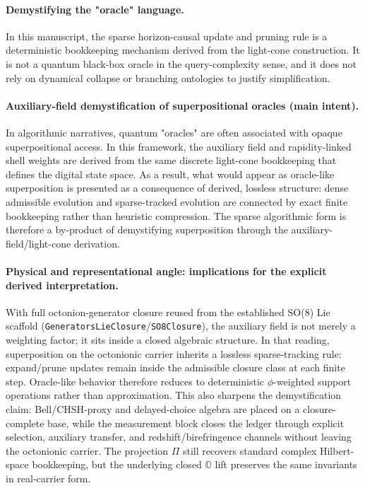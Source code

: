 \documentclass[11pt,a4paper]{article}
\theoremstyle{remark}
\begin{document}
\paragraph{Demystifying the "oracle" language.}
In this manuscript, the sparse horizon-causal update and pruning rule is a deterministic bookkeeping mechanism derived from the light-cone construction. It is not a quantum black-box oracle in the query-complexity sense, and it does not rely on dynamical collapse or branching ontologies to justify simplification.

\paragraph{Auxiliary-field demystification of superpositional oracles (main intent).}
In algorithmic narratives, quantum "oracles" are often associated with opaque superpositional access. In this framework, the auxiliary field and rapidity-linked shell weights are derived from the same discrete light-cone bookkeeping that defines the digital state space. As a result, what would appear as oracle-like superposition is presented as a consequence of derived, lossless structure: dense admissible evolution and sparse-tracked evolution are connected by exact finite bookkeeping rather than heuristic compression. The sparse algorithmic form is therefore a by-product of demystifying superposition through the auxiliary-field/light-cone derivation.

\paragraph{Physical and representational angle: implications for the explicit derived interpretation.}
With full octonion-generator closure reused from the established SO(8) Lie scaffold (\texttt{GeneratorsLieClosure}/\texttt{SO8Closure}), the auxiliary field is not merely a weighting factor; it sits inside a closed algebraic structure. In that reading, superposition on the octonionic carrier inherits a lossless sparse-tracking rule: expand/prune updates remain inside the admissible closure class at each finite step. Oracle-like behavior therefore reduces to deterministic $\phi$-weighted support operations rather than approximation. This also sharpens the demystification claim: Bell/CHSH-proxy and delayed-choice algebra are placed on a closure-complete base, while the measurement block closes the ledger through explicit selection, auxiliary transfer, and redshift/birefringence channels without leaving the octonionic carrier. The projection $\Pi$ still recovers standard complex Hilbert-space bookkeeping, but the underlying closed $\mathbb{O}$ lift preserves the same invariants in real-carrier form.
\end{document}
